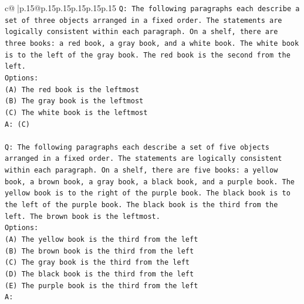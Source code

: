 \documentclass{article}
\begin{document}
{\begin{supertabular}{c@{$\;$}|p{.15\linewidth}@{}p{.15\linewidth}p{.15\linewidth}p{.15\linewidth}p{.15\linewidth}p{.15\linewidth}}
{{{\texttt{Q: The following paragraphs each describe a set of three objects arranged in a fixed order. The statements are logically consistent within each paragraph. On a shelf, there are three books: a red book, a gray book, and a white book. The white book is to the left of the gray book. The red book is the second from the left.} \\
\texttt{Options:} \\
\texttt{(A) The red book is the leftmost} \\
\texttt{(B) The gray book is the leftmost} \\
\texttt{(C) The white book is the leftmost} \\
\texttt{A: (C)} \\
\\ 
\texttt{Q: The following paragraphs each describe a set of five objects arranged in a fixed order. The statements are logically consistent within each paragraph. On a shelf, there are five books: a yellow book, a brown book, a gray book, a black book, and a purple book. The yellow book is to the right of the purple book. The black book is to the left of the purple book. The black book is the third from the left. The brown book is the leftmost.} \\
\texttt{Options:} \\
\texttt{(A) The yellow book is the third from the left} \\
\texttt{(B) The brown book is the third from the left} \\
\texttt{(C) The gray book is the third from the left} \\
\texttt{(D) The black book is the third from the left} \\
\texttt{(E) The purple book is the third from the left} \\
\texttt{A:} \\
            }
        }
    }
     \\ \\


\end{supertabular}}
\end{document}
